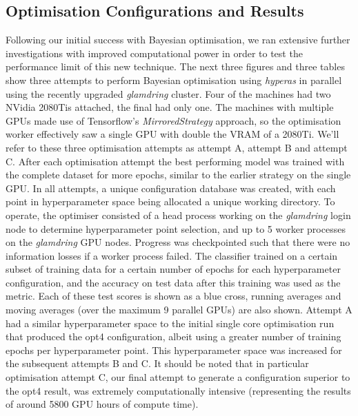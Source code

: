 \subsection{Optimisation Configurations and Results}
Following our initial success with Bayesian optimisation, we ran extensive further investigations with improved computational power in order to test the performance limit of this new technique. The next three figures and three tables show three attempts to perform Bayesian optimisation using \textit{hyperas} in parallel using the recently upgraded \textit{glamdring} cluster. Four of the machines had two NVidia 2080Tis attached, the final had only one. The machines with multiple GPUs made use of Tensorflow's \textit{MirroredStrategy} approach, so the optimisation worker effectively saw a single GPU with double the VRAM of a 2080Ti. We'll refer to these three optimisation attempts as attempt A, attempt B and attempt C. After each optimisation attempt the best performing model was trained with the complete dataset for more epochs, similar to the earlier strategy on the single GPU. In all attempts, a unique configuration database was created, with each point in hyperparameter space being allocated a unique working directory. To operate, the optimiser consisted of a head process working on the \textit{glamdring} login node to determine hyperparameter point selection, and up to 5 worker processes on the \textit{glamdring} GPU nodes. Progress was checkpointed such that there were no information losses if a worker process failed. The classifier trained on a certain subset of training data for a certain number of epochs for each hyperparameter configuration, and the accuracy on test data after this training was used as the metric. Each of these test scores is shown as a blue cross, running averages and moving averages (over the maximum 9 parallel GPUs) are also shown. Attempt A had a similar hyperparameter space to the initial single core optimisation run that produced the opt4 configuration, albeit using a greater number of training epochs per hyperparameter point. This hyperparameter space was increased for the subsequent attempts B and C. It should be noted that in particular optimisation attempt C, our final attempt to generate a configuration superior to the opt4 result, was extremely computationally intensive (representing the results of around 5800 GPU hours of compute time).

